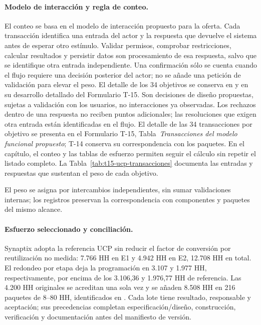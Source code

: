 \paragraph{Modelo de interacción y regla de conteo.} El conteo se basa en el modelo de interacción propuesto para la oferta. Cada transacción identifica una entrada del actor y la respuesta que devuelve el sistema antes de esperar otro estímulo. Validar permisos, comprobar restricciones, calcular resultados y persistir datos son procesamiento de esa respuesta, salvo que se identifique otra entrada independiente. Una confirmación sólo se cuenta cuando el flujo requiere una decisión posterior del actor; no se añade una petición de validación para elevar el peso. El detalle de los 34 objetivos se conserva en  y en su desarrollo detallado del Formulario T-15. Son decisiones de diseño propuestas, sujetas a validación con los usuarios, no interacciones ya observadas. Los rechazos dentro de una respuesta no reciben puntos adicionales; las resoluciones que exigen otra entrada están identificadas en el flujo.
\ifdefined\EnCuerpoSD
El detalle de las 34 transacciones por objetivo se presenta en el Formulario T-15, Tabla~\textit{Transacciones del modelo funcional propuesto}; T-14 conserva su correspondencia con los paquetes. En el capítulo, el conteo y las tablas de esfuerzo permiten seguir el cálculo sin repetir el listado completo.
\else
La Tabla~\ref{tab:t15-ucp-transacciones} documenta las entradas y respuestas que sustentan el peso de cada objetivo.

El peso se asigna por intercambios independientes, sin sumar validaciones internas; los registros preservan la correspondencia con componentes y paquetes del mismo alcance.
\fi

\paragraph{Esfuerzo seleccionado y conciliación.} Synaptix adopta la referencia UCP sin reducir el factor de conversión por reutilización no medida: 7.766 HH en E1 y 4.942 HH en E2, 12.708 HH en total. El redondeo por etapa deja la programación en 3.107 y 1.977 HH, respectivamente, por encima de los 3.106,36 y 1.976,77 HH de referencia. Las 4.200 HH originales se acreditan una sola vez y se añaden 8.508 HH en 216 paquetes de 8--80 HH, identificados en . Cada lote tiene resultado, responsable y aceptación; sus precedencias completan especificación/diseño, construcción, verificación y documentación antes del manifiesto de versión.

